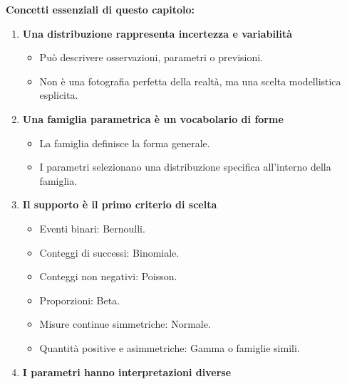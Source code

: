 \documentclass[
  italian,
  letterpaper,
  a4paper,
  11pt,
  open=any]{scrbook}
\providecommand{\tightlist}{%
  \setlength{\itemsep}{0pt}\setlength{\parskip}{0pt}}
\theoremstyle{plain}
\theoremstyle{definition}
\theoremstyle{definition}
\theoremstyle{remark}
\begin{document}
\begin{tcolorbox}[enhanced jigsaw, arc=.35mm, bottomrule=.15mm, bottomtitle=1mm, breakable, colback=white, colbacktitle=quarto-callout-important-color!10!white, colframe=quarto-callout-important-color-frame, coltitle=black, left=2mm, leftrule=.75mm, opacityback=0, opacitybacktitle=0.6, rightrule=.15mm, title=\textcolor{quarto-callout-important-color}{\faExclamation}\hspace{0.5em}{Importante}, titlerule=0mm, toprule=.15mm, toptitle=1mm]

\textbf{Concetti essenziali di questo capitolo:}

\begin{enumerate}
\def\labelenumi{\arabic{enumi}.}
\tightlist
\item
  \textbf{Una distribuzione rappresenta incertezza e variabilità}

  \begin{itemize}
  \tightlist
  \item
    Può descrivere osservazioni, parametri o previsioni.
  \item
    Non è una fotografia perfetta della realtà, ma una scelta
    modellistica esplicita.
  \end{itemize}
\item
  \textbf{Una famiglia parametrica è un vocabolario di forme}

  \begin{itemize}
  \tightlist
  \item
    La famiglia definisce la forma generale.
  \item
    I parametri selezionano una distribuzione specifica all'interno
    della famiglia.
  \end{itemize}
\item
  \textbf{Il supporto è il primo criterio di scelta}

  \begin{itemize}
  \tightlist
  \item
    Eventi binari: Bernoulli.
  \item
    Conteggi di successi: Binomiale.
  \item
    Conteggi non negativi: Poisson.
  \item
    Proporzioni: Beta.
  \item
    Misure continue simmetriche: Normale.
  \item
    Quantità positive e asimmetriche: Gamma o famiglie simili.
  \end{itemize}
\item
  \textbf{I parametri hanno interpretazioni diverse}


\end{enumerate}
\end{tcolorbox}
\end{document}
